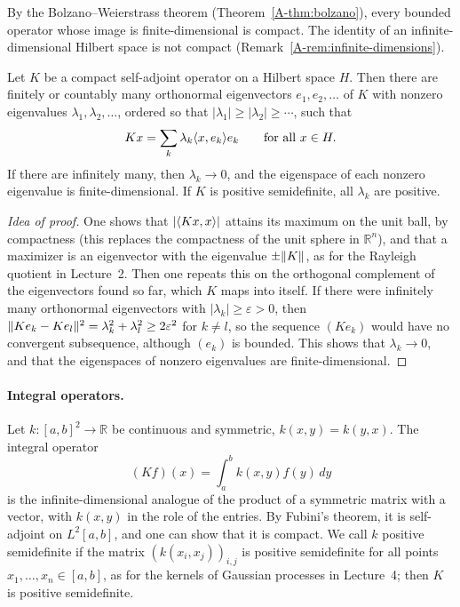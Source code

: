 By the Bolzano--Weierstrass theorem (Theorem~\ref{A-thm:bolzano}), every bounded operator whose image is finite-dimensional is compact. The identity of an infinite-dimensional Hilbert space is not compact (Remark~\ref{A-rem:infinite-dimensions}).

\begin{theorem}\label{A-thm:spectral-compact}
    Let $K$ be a compact self-adjoint operator on a Hilbert space $H$. Then there are finitely or countably many orthonormal eigenvectors $e_1, e_2, \ldots$ of $K$ with nonzero eigenvalues $\lambda_1, \lambda_2, \ldots$, ordered so that $|\lambda_1| \geq |\lambda_2| \geq \cdots$, such that
    \[Kx = \sum_k \lambda_k\langle x, e_k \rangle e_k \qquad \text{for all } x \in H.\]
    If there are infinitely many, then $\lambda_k \to 0$, and the eigenspace of each nonzero eigenvalue is finite-dimensional. If $K$ is positive semidefinite, all $\lambda_k$ are positive.
\end{theorem}

\begin{proof}[Idea of proof]
    One shows that $|\langle Kx, x \rangle|$ attains its maximum on the unit ball, by compactness (this replaces the compactness of the unit sphere in $\mathbb{R}^n$), and that a maximizer is an eigenvector with the eigenvalue $\pm\lVert K \rVert$, as for the Rayleigh quotient in Lecture~2. Then one repeats this on the orthogonal complement of the eigenvectors found so far, which $K$ maps into itself. If there were infinitely many orthonormal eigenvectors with $|\lambda_k| \geq \varepsilon > 0$, then $\lVert Ke_k - Ke_l \rVert^2 = \lambda_k^2 + \lambda_l^2 \geq 2\varepsilon^2$ for $k \neq l$, so the sequence $(Ke_k)$ would have no convergent subsequence, although $(e_k)$ is bounded. This shows that $\lambda_k \to 0$, and that the eigenspaces of nonzero eigenvalues are finite-dimensional.
\end{proof}

\paragraph{Integral operators.} Let $k: [a, b]^2 \to \mathbb{R}$ be continuous and symmetric, $k(x, y) = k(y, x)$. The integral operator
\[(Kf)(x) = \int_a^b k(x, y)f(y)\, dy\]
is the infinite-dimensional analogue of the product of a symmetric matrix with a vector, with $k(x, y)$ in the role of the entries. By Fubini's theorem, it is self-adjoint on $L^2[a, b]$, and one can show that it is compact. We call $k$ positive semidefinite if the matrix $(k(x_i, x_j))_{i, j}$ is positive semidefinite for all points $x_1, \ldots, x_n \in [a, b]$, as for the kernels of Gaussian processes in Lecture~4; then $K$ is positive semidefinite.

